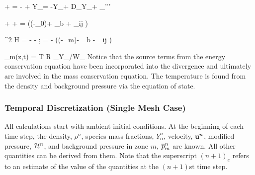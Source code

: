 \documentclass[11pt]{book}
\begin{document}
\be {} + \bu \cdot \nabla \rho
       =  -\rho \nabla \cdot \bu  \label{mass2} \ee
{}
\be {} + \bu \cdot \nabla \rho Y_\alpha  =
-\rho Y_\alpha \nabla \cdot \bu + \nabla \cdot \rho D_\alpha \nabla Y_\alpha + \dm_\alpha'''
  \label{species2} \ee

\be {} + \bu \times \bo +  =
   \left((\rho-\rho_0)\bg + {\bof_b}
  + \nabla \cdot \btau_{ij} \right) \label{momentum2} \ee

\be \nabla^2 {\cal H} = - - \nabla \cdot \bF  \quad ; \quad
\bF = \bu \times \bo -  \left((\rho-\rho_m)\bg - {\bof_b} - \nabla \cdot \btau_{ij} \right)   \label{simplephi2} \ee

\be \bp_m(z,t) = \rho T {\cal R} \sum_\alpha  Y_\alpha/W_\alpha \ee
Notice that the source terms from the energy conservation equation have
been incorporated into the divergence and ultimately are involved in
the mass conservation equation. The temperature is found from the
density and background pressure via the equation of state.

\subsubsection{Temporal Discretization (Single Mesh Case)}

All calculations start with ambient initial conditions.
At the beginning of each time step, the density,
$\rho^n$, species mass fractions, $Y_\alpha^n$, velocity, ${\bf u}^n$, modified pressure, ${\cal H}^n$, and background
pressure in zone $m$, $\overline{p}_m^n$ are known. All
other quantities can be derived from them.
Note that the superscript $(n+1)_e$ refers to an estimate of the value
of the quantities at the $(n+1)$st time step.
\end{document}
